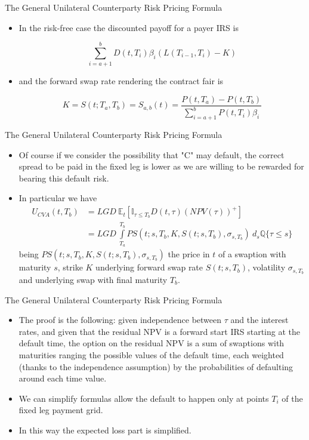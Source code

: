 \documentclass[11pt]{beamer}
\begin{document}
\begin{frame}{The General Unilateral Counterparty Risk Pricing Formula}
\begin{itemize}
\item In the risk-free case the discounted payoff for a payer IRS is

\begin{equation}
\sum\limits_{i=a+1}^b  D(t,T_i) \beta_i (L(T_{i-1},T_i) -K)
\end{equation}

\item and the forward swap rate rendering the contract fair is

$$
K=S(t; T_a,T_b) = S_{a,b} (t) = \frac{P(t,T_a) - P(t,T_b)}{\sum\limits_{i=a+1}^b  P(t,T_i) \beta_i}
$$
\end{itemize}
\end{frame}
\begin{frame}{The General Unilateral Counterparty Risk Pricing Formula}
\begin{itemize}
\item Of course if we consider the possibility that "C" may default, the correct spread to be paid in the fixed leg is lower as we are willing to be rewarded for bearing this default risk. 
\item In particular we have
\begin{equation}
\begin{split}
U_{CVA}(t,T_b) &= LGD \> \mathbb{E}_t [ \mathbb{I}_{\tau \le T_b} D(t,\tau) (NPV(\tau))^+ ] \\
&= LGD \> \int\limits_{T_a}^{T_b} PS \left( t;s,T_b,K,S(t;s,T_b), \sigma_{s,T_b} \right) \> d_s \mathbb{Q} \{\tau \le s \}
\end{split}
\end{equation}
being $PS \left( t;s,T_b,K,S(t;s,T_b), \sigma_{s,T_b} \right) $ the price in $t$ of a swaption with maturity $s$, strike $K$ underlying forward swap rate $S(t;s,T_b)$, volatility $\sigma_{s,T_b}$ and underlying swap with final maturity $T_b$.
\end{itemize}
\end{frame}
\begin{frame}{The General Unilateral Counterparty Risk Pricing Formula}
\begin{itemize}
\item The proof is the following: given independence between $\tau$ and the interest rates, and given that the residual NPV is a forward start IRS starting at the default time, the option on the residual NPV is a sum of swaptions with maturities ranging the possible values of the default time, each weighted (thanks to the independence assumption) by the probabilities of defaulting around each time value. 
\item We can simplify formulas allow the default to happen only at points $T_i$ of the fixed leg payment grid. 
\item In this way the expected loss part is simplified. 
\end{itemize}
\end{frame}
\end{document}
